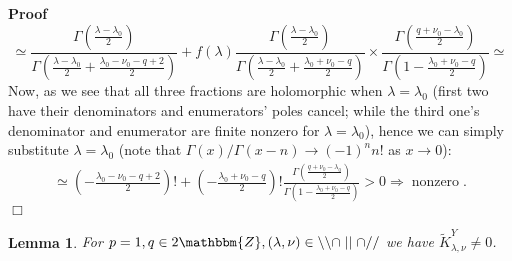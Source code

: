 \documentclass{article}
\newcommand{\tmop}[1]{\ensuremath{\operatorname{#1}}}
\renewenvironment{proof}{\noindent\textbf{Proof\ }}{\hspace*{\fill}$\Box$\medskip}
\newtheorem{lemma}[proposition]{Lemma}
\theoremstyle{remark}
\begin{document}
\begin{proof}
\[     \simeq \frac{\Gamma \left( \frac{\lambda - \lambda_0}{2} \right)}{\Gamma
     \left( \frac{\lambda - \lambda_0}{2} + \frac{\lambda_0 - \nu_0 - q +
     2}{2} \right)} + f (\lambda) \frac{\Gamma \left( \frac{\lambda -
     \lambda_0}{2} \right)}{\Gamma \left( \frac{\lambda - \lambda_0}{2} +
     \frac{\lambda_0 + \nu_0 - q}{2} \right)} \times \frac{\Gamma \left(
     \frac{q + \nu_0 - \lambda_0}{2} \right)}{\Gamma \left( 1 -
     \frac{\lambda_0 + \nu_0 - q}{2} \right)} \simeq \]
  Now, as we see that all three fractions are holomorphic when $\lambda =
  \lambda_0$ (first two have their denominators and enumerators' poles cancel;
  while the third one's denominator and enumerator are finite nonzero for
  $\lambda = \lambda_0$), hence we can simply substitute $\lambda = \lambda_0$
  (note that $\Gamma (x) / \Gamma (x - n) \rightarrow (- 1)^n n!$ as $x
  \rightarrow 0$):
  \begin{eqnarray}
    & \simeq \left( - \frac{\lambda_0 - \nu_0 - q + 2}{2} \right) ! + \left(
    - \frac{\lambda_0 + \nu_0 - q}{2} \right) ! \frac{\Gamma \left( \frac{q +
    \nu_0 - \lambda_0}{2} \right)}{\Gamma \left( 1 - \frac{\lambda_0 + \nu_0 -
    q}{2} \right)} > 0 \Rightarrow \tmop{nonzero} . &  \nonumber
  \end{eqnarray}
\end{proof}

\begin{lemma}
  \label{supp-sing:lem-strangelove-Y}For $p = 1, q \in 2\mathbbm{Z}, (\lambda,
  \nu) \in \backslash\backslash \cap \mid \mid \cap / /$ we have
  $\tilde{K}_{\lambda, \nu}^Y \neq 0$.
\end{lemma}
\end{document}
